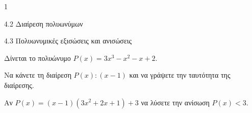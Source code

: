\begin{ylh}{1}
\item 4.2 Διαίρεση πολυωνύμων
\item 4.3 Πολυωνυμικές εξισώσεις και ανισώσεις
\end{ylh}
Δίνεται το πολυώνυμο $P(x) = 3x^3 - x^2 - x + 2$.
\begin{alist}
\item Να κάνετε τη διαίρεση $P(x) : (x - 1)$ και να γράψετε την ταυτότητα της διαίρεσης.
\item Αν $P(x) = (x - 1)(3x^2 + 2x + 1) + 3$ να λύσετε την ανίσωση $P(x) < 3$.
\end{alist}

